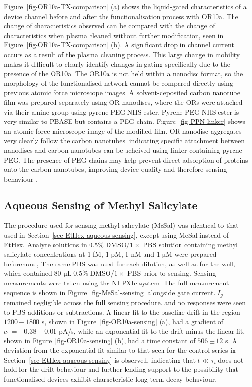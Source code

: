 \documentclass[
  a4paper,
]{scrbook}
\begin{document}
Figure~\ref{fig-OR10a-TX-comparison} (a) shows the liquid-gated
characteristics of a device channel before and after the
functionalisation process with OR10a. The change of characteristics
observed can be compared with the change of characteristics when plasma
cleaned without further modification, seen in
Figure~\ref{fig-OR10a-TX-comparison} (b). A significant drop in channel
current occurs as a result of the plasma cleaning process. This large
change in mobility makes it difficult to clearly identify changes in
gating specifically due to the presence of the OR10a. The OR10a is not
held within a nanodisc format, so the morphology of the functionalised
network cannot be compared directly using previous atomic force
microscope images. A solvent-deposited carbon nanotube film was prepared
separately using OR nanodiscs, where the ORs were attached via their
amine group using pyrene-PEG-NHS ester. Pyrene-PEG-NHS ester is very
similar to PBASE but contains a PEG chain. Figure~\ref{fig-PPN-linker}
shows an atomic force microscope image of the modified film. OR nanodisc
aggregates very clearly follow the carbon nanotubes, indicating specific
attachment between nanodiscs and carbon nanotubes can be acheived using
linker containing pyrene-PEG. The presence of PEG chains may help
prevent direct adsorption of proteins onto the carbon nanotubes,
improving device quality and therefore sensing behaviour
\autocite{Star2003a,Chen2004}.

\hypertarget{sec-MeSal-aqueous-sensing}{%
\subsection{Aqueous Sensing of Methyl
Salicylate}\label{sec-MeSal-aqueous-sensing}}

The procedure used for sensing methyl salicylate (MeSal) was identical
to that used in Section~\ref{sec-EtHex-aqueous-sensing}, except using
MeSal instead of EtHex. Analyte solutions in 0.5\% DMSO/\(1 \times\) PBS
solution containing methyl salicylate concentrations at 1 fM, 1 pM, 1 nM
and 1 µM were prepared beforehand, The same PBS was used for each
dilution, as well as for the well, which contained 80 µL 0.5\%
DMSO/\(1 \times\) PBS prior to sensing. Sensing measurements were taken
using the NI-PXIe system. The full measurement sequence is shown in
Figure~\ref{fig-MeSal-sensing} alongside gate current. \(I_g\) remained
negligible across the full sensing procedure, and no responses were seen
to PBS additions or subtractions. A linear fit to the baseline drift in
the region \(1200-1800\) s, shown in Figure~\ref{fig-OR10a-sensing} (a),
had a gradient of \(c_1 = -0.38\pm0.01\) pA/s, while an exponential fit
to the drift minus the linear fit, shown in
Figure~\ref{fig-OR10a-sensing} (b), had a time constant of
\(506 \pm 12\) s. A deviation from the exponential fit similar to that
seen for the control series in Section~\ref{sec-EtHex-aqueous-sensing}
is observed, indicating that \(t\ll\tau_i\) does not hold for the drift
behaviour and further lending support to the possibility that
functionalised devices exhibit characteristic long-term decay behaviour.
\end{document}
